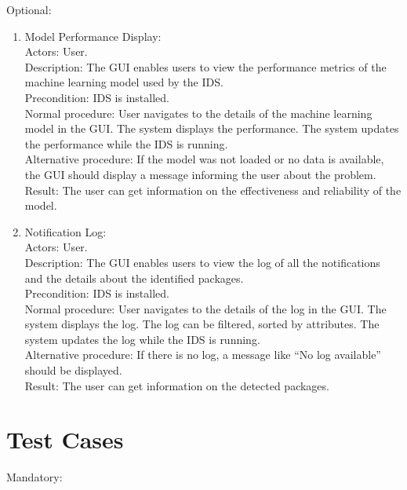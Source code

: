 \documentclass[oneside, english]{reports/assets/sdqtechreport}
\begin{document}
Optional:

\begin{enumerate}
	\item Model Performance Display: \\Actors: User. \\Description: The GUI enables users to
	      view the performance metrics of the machine learning model used by the IDS.
	      \\Precondition: IDS is installed. \\Normal procedure: User navigates to the details
	      of the machine learning model in the GUI. The system displays the performance.
	      The system updates the performance while the IDS is running. \\Alternative
	      procedure: If the model was not loaded or no data is available, the GUI should
	      display a message informing the user about the problem. \\Result: The user can
	      get information on the effectiveness and reliability of the model.
	\item Notification Log: \\Actors: User. \\Description: The GUI enables users to view the
	      log of all the notifications and the details about the identified packages.
	      \\Precondition: IDS is installed. \\Normal procedure: User navigates to the details
	      of the log in the GUI. The system displays the log. The log can be filtered,
	      sorted by attributes. The system updates the log while the IDS is running.
	      \\Alternative procedure: If there is no log, a message like “No log available”
	      should be displayed. \\Result: The user can get information on the detected
	      packages.
\end{enumerate}

\chapter{Test Cases}
\label{chap:TestCases}

Mandatory:
\end{document}
